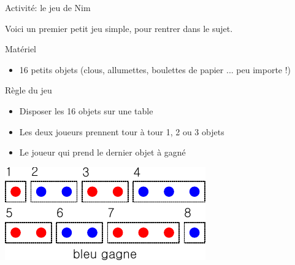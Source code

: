 \begin{frame}{Activité: le jeu de Nim}

  Voici un premier petit jeu simple, pour rentrer dans le sujet.

  \begin{block}{Matériel}
    \begin{itemize}
    \item 16 petits objets (clous, allumettes, boulettes de papier ... peu importe !)
    \end{itemize}
  \end{block}

  \begin{block}{Règle du jeu}
    \begin{itemize}
    \item Disposer les 16 objets sur une table
    \item Les deux joueurs prennent tour à tour 1, 2 ou 3 objets
    \item Le joueur qui prend le dernier objet à gagné
    \end{itemize}
  \end{block}

  \bigskip \bigskip  \bigskip \bigskip

  \begin{center}
    \includegraphics[width=0.8\linewidth]{img/nim.pdf}
  \end{center}

\end{frame}

